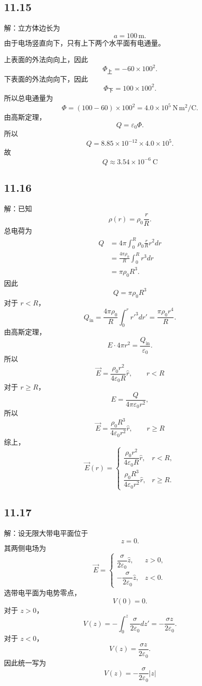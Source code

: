 \documentclass[UTF8,a4paper,12pt]{ctexart}
\begin{document}
\subsection*{11.15}

解：立方体边长为
\[
a=100\,\mathrm{m}.
\]
由于电场竖直向下，只有上下两个水平面有电通量。

上表面的外法向向上，因此
\[
\Phi_{\text{上}}
=
-60\times100^2.
\]
下表面的外法向向下，因此
\[
\Phi_{\text{下}}
=
100\times100^2.
\]
所以总电通量为
\[
\Phi
=
(100-60)\times100^2
=
4.0\times10^5
\ \mathrm{N\,m^2/C}.
\]
由高斯定理，
\[
Q=\varepsilon_0\Phi.
\]
所以
\[
Q
=
8.85\times10^{-12}
\times4.0\times10^5.
\]
故
\[
\boxed{
Q\approx3.54\times10^{-6}\ \mathrm{C}
}
\]

\subsection*{11.16}

解：已知
\[
\rho(r)=\rho_0\frac{r}{R}.
\]
总电荷为
\[
\begin{aligned}
Q
&=
4\pi
\int_0^R
\rho_0\frac{r}{R}r^2dr\\
&=
\frac{4\pi\rho_0}{R}
\int_0^Rr^3dr\\
&=
\pi\rho_0R^3.
\end{aligned}
\]
因此
\[
\boxed{
Q=\pi\rho_0R^3
}
\]
对于 $r<R$，
\[
Q_{\text{in}}
=
\frac{4\pi\rho_0}{R}
\int_0^r r'^3dr'
=
\frac{\pi\rho_0r^4}{R}.
\]
由高斯定理，
\[
E\cdot4\pi r^2
=
\frac{Q_{\text{in}}}{\varepsilon_0}.
\]
所以
\[
\boxed{
\vec{E}
=
\frac{\rho_0r^2}{4\varepsilon_0R}\hat{r},
\qquad r<R
}
\]
对于 $r\ge R$，
\[
E
=
\frac{Q}{4\pi\varepsilon_0r^2},
\]
所以
\[
\boxed{
\vec{E}
=
\frac{\rho_0R^3}{4\varepsilon_0r^2}\hat{r},
\qquad r\ge R
}
\]
综上，
\[
\boxed{
\vec{E}(r)=
\begin{cases}
\dfrac{\rho_0r^2}{4\varepsilon_0R}\hat{r},
& r<R,\\[8pt]
\dfrac{\rho_0R^3}{4\varepsilon_0r^2}\hat{r},
& r\ge R.
\end{cases}
}
\]

\subsection*{11.17}

解：设无限大带电平面位于
\[
z=0.
\]
其两侧电场为
\[
\vec{E}
=
\begin{cases}
\dfrac{\sigma}{2\varepsilon_0}\hat{z},
&z>0,\\[6pt]
-\dfrac{\sigma}{2\varepsilon_0}\hat{z},
&z<0.
\end{cases}
\]
选带电平面为电势零点，
\[
V(0)=0.
\]
对于 $z>0$，
\[
V(z)
=
-\int_0^z
\frac{\sigma}{2\varepsilon_0}dz'
=
-\frac{\sigma z}{2\varepsilon_0}.
\]
对于 $z<0$，
\[
V(z)
=
\frac{\sigma z}{2\varepsilon_0}.
\]
因此统一写为
\[
\boxed{
V(z)
=
-\frac{\sigma}{2\varepsilon_0}|z|
}
\]
\end{document}
